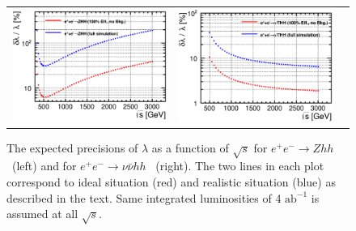 \begin{figure}[htb]
  \centering
  \begin{tabular}[c]{ccc}
    \includegraphics[width=0.45\hsize]{chapters/figures/coupling_zhh_125_-1.eps} &
    \includegraphics[width=0.45\hsize]{chapters/figures/coupling_nnhh_125_-1.eps} \\   
 \end{tabular}
  \caption{The expected precisions of $\lambda$ as a function of $\sqrt{s}$ for $e^+e^-\to Zhh$ ~(left) and
for $e^+e^-\to\nu\bar{\nu}hh$ ~(right). The two lines in each plot correspond to ideal situation (red) and 
realistic situation (blue) as described in the text. Same integrated luminosities of 4 $\mathrm{ab}^{-1}$ is 
assumed at all $\sqrt{s}$.}
  \label{fig:HHHSensitivity}
\end{figure}

